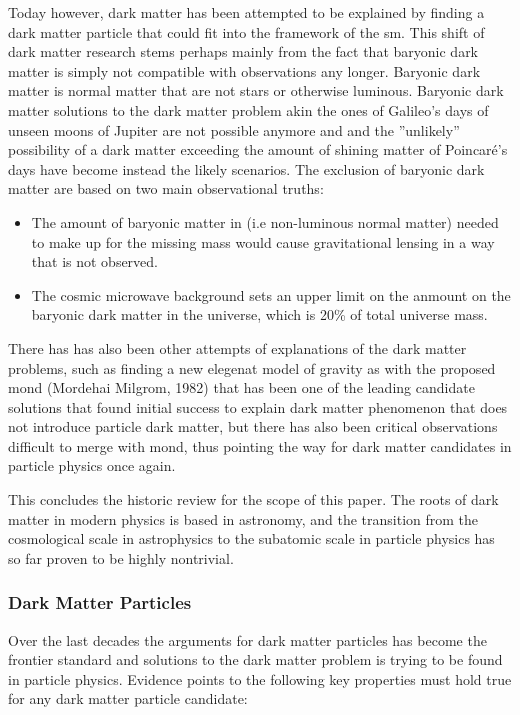 Today however, dark matter has been attempted to be explained by finding a dark matter particle that could fit into the framework of the \gls{sm}. This shift of dark matter research stems perhaps mainly from the fact that baryonic dark matter is simply not compatible with observations any longer. Baryonic dark matter is normal matter that are not stars or otherwise luminous. Baryonic dark matter solutions to the dark matter problem akin the ones of Galileo’s days of unseen moons of Jupiter are not possible anymore and and the ''unlikely'' possibility of a dark matter exceeding the amount of shining matter of Poincaré's days have become instead the likely scenarios. The exclusion of baryonic dark matter are based on two main observational truths: 

\begin{itemize}
    \item The amount of baryonic matter in (i.e non-luminous normal matter) needed to make up for the missing mass would cause gravitational lensing in a way that is not observed. 
    \item The cosmic microwave background sets an upper limit on the anmount on the baryonic dark matter in the universe, which is 20\% of total universe mass. 
\end{itemize}

There has has also been other attempts of explanations of the dark matter problems, such as finding a new elegenat model of gravity as with the proposed \gls{mond} (Mordehai Milgrom, 1982) that has been one of the leading candidate solutions that found initial success to explain dark matter phenomenon that does not introduce particle dark matter, but there has also been critical observations difficult to merge with \gls{mond}, thus pointing the way for dark matter candidates in particle physics once again. 

This concludes the historic review for the scope of this paper. The roots of dark matter in modern physics is based in astronomy, and the transition from the cosmological scale in astrophysics to the subatomic scale in particle physics has so far proven to be highly nontrivial.

\subsubsection{Dark Matter Particles}
\label{sec:dm_particles}

Over the last decades the arguments for dark matter particles has become the frontier standard and solutions to the dark matter problem is trying to be found in particle physics. Evidence points to the following key properties must hold true for any dark matter particle candidate:

